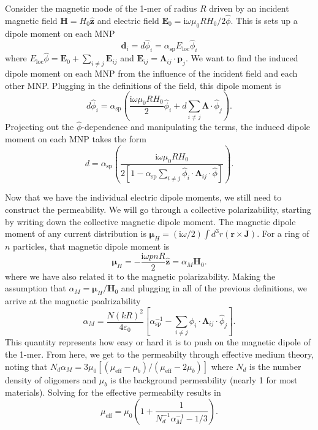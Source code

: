 \documentclass [11pt, proquest] {uwthesis}[2016/11/22]
\begin{document}
Consider the magnetic mode of the 1-mer of radius $R$ driven by an incident magnetic field $\textbf{H} = H_0\hat{\textbf{z}}$ and electric field $\textbf{E}_0 = \textrm{i}\omega\mu_0RH_0/2\hat{\phi}$. This is sets up a dipole moment on each MNP
\begin{equation}
\textbf{d}_i = d\hat{\phi}_i = \alpha_{\textrm{sp}}E_{\textrm{loc}}\hat{\phi}_i
\label{dipole_moment_1}
\end{equation}
where $E_{\textrm{loc}}\hat{\phi} = \textbf{E}_0 + \sum_{i\neq j}\textbf{E}_{ij}$ and $\textbf{E}_{ij} = \boldsymbol{\Lambda}_{ij}\cdot\textbf{p}_j$. We want to find the induced dipole moment on each MNP from the influence of the incident field and each other MNP. Plugging in the definitions of the field, this dipole moment is
\begin{equation}
d\hat{\phi}_i = \alpha_{\textrm{sp}}\left(\frac{\textrm{i}\omega\mu_0RH_0}{2}\hat{\phi}_i + d\sum_{i\neq j}\boldsymbol{\Lambda}\cdot\hat{\phi}_j\right).
\label{dipole_moment_2}
\end{equation}
Projecting out the $\hat{\phi}$-dependence and manipulating the terms, the induced dipole moment on each MNP takes the form
\begin{equation}
d = \alpha_{\textrm{sp}}\left(\frac{\textrm{i}\omega\mu_0RH_0}{2\left[1 - \alpha_{\textrm{sp}}\sum_{i\neq j}\hat{\phi}_i\cdot\boldsymbol{\Lambda}_{ij}\cdot\hat{\phi}\right]}\right).
\label{dipole_moment_3}
\end{equation}

Now that we have the individual electric dipole moments, we still need to construct the permeability. We will go through a collective polarizability, starting by writing down the collective magnetic dipole moment. The magnetic dipole moment of any current distribution is $\boldsymbol{\mu}_H = (\textrm{i}\omega/2)\int d^3r(\textbf{r}\times\textbf{J})$. For a ring of $n$ particles, that magnetic dipole moment is
\begin{equation}
\boldsymbol{\mu}_H = -\frac{\textrm{i}\omega pnR}{2}\hat{\textbf{z}} = \alpha_{M}\textbf{H}_0.
\label{mag_dip_1}
\end{equation}
where we have also related it to the magnetic polarizability. Making the assumption that $\alpha_M = \boldsymbol{\mu}_H/\textbf{H}_0$ and plugging in all of the previous definitions, we arrive at the magnetic poalrizability
\begin{equation}
\alpha_M = \frac{N(kR)^2}{4\varepsilon_0}\left[\alpha_{\textrm{sp}}^{-1} - \sum_{i\neq j} \hat{\phi}_i\cdot\boldsymbol{\Lambda}_{ij}\cdot\hat{\phi}_j\right].
\label{alpha_mag}
\end{equation}
This quantity represents how easy or hard it is to push on the magnetic dipole of the 1-mer. From here, we get to the permeabilty through effective medium theory, noting that $N_d\alpha_M = 3\mu_0[(\mu_{\textrm{eff}}-\mu_b)/(\mu_{\textrm{eff}}-2\mu_b)]$ where $N_d$ is the number density of oligomers and $\mu_b$ is the background permeability (nearly 1 for most materials). Solving for the effective permeabilty results in
\begin{equation}
\mu_{\textrm{eff}} = \mu_0\left(1+\frac{1}{N_d^{-1}\alpha_M^{-1}-1/3}\right).
\label{mu_eff}
\end{equation}
\end{document}
